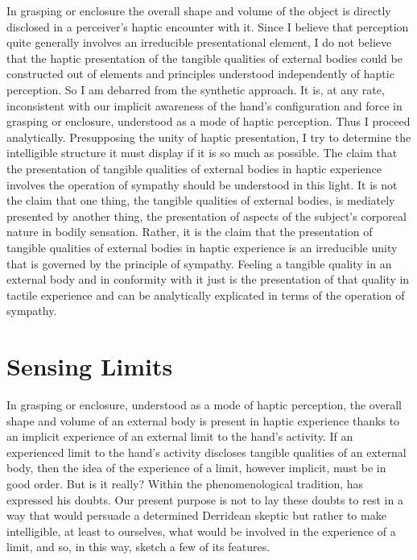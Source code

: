 In grasping or enclosure the overall shape and volume of the object is directly disclosed in a perceiver's haptic encounter with it. Since I believe that perception quite generally involves an irreducible presentational element, I do not believe that the haptic presentation of the tangible qualities of external bodies could be constructed out of elements and principles understood independently of haptic perception. So I am debarred from the synthetic approach. It is, at any rate, inconsistent with our implicit awareness of the hand's configuration and force in grasping or enclosure, understood as a mode of haptic perception. Thus I proceed analytically. Presupposing the unity of haptic presentation, I try to determine the intelligible structure it must display if it is so much as possible. The claim that the presentation of tangible qualities of external bodies in haptic experience involves the operation of sympathy should be understood in this light. It is not the claim that one thing, the tangible qualities of external bodies, is mediately presented by another thing, the presentation of aspects of the subject's corporeal nature in bodily sensation. Rather, it is the claim that the presentation of tangible qualities of external bodies in haptic experience is an irreducible unity that is governed by the principle of sympathy. Feeling a tangible quality in an external body and in conformity with it just is the presentation of that quality in tactile experience and can be analytically explicated in terms of the operation of sympathy.


\section{Sensing Limits} %
\label{sec:sensing_limits}

In grasping or enclosure, understood as a mode of haptic perception, the overall shape and volume of an external body is present in haptic experience thanks to an implicit experience of an external limit to the hand's activity. If an experienced limit to the hand's activity discloses tangible qualities of an external body, then the idea of the experience of a limit, however implicit, must be in good order. But is it really? Within the phenomenological tradition, \citet{Derrida:2005aa} has expressed his doubts. Our present purpose is not to lay these doubts to rest in a way that would persuade a determined Derridean skeptic but rather to make intelligible, at least to ourselves, what would be involved in the experience of a limit, and so, in this way, sketch a few of its features.

